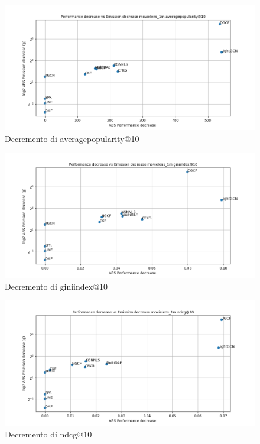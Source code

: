 \begin{figure}[H]
    \centering
     \includegraphics[width=\textwidth]{images/decrement_averagepopularity@10_movielens_1m_40_7.png}
    \caption{Decremento di averagepopularity@10}
\end{figure}

\begin{figure}[H]
    \centering
     \includegraphics[width=\textwidth]{images/decrement_giniindex@10_movielens_1m_40_7.png}
    \caption{Decremento di giniindex@10}
\end{figure}

\begin{figure}[H]
    \centering
     \includegraphics[width=\textwidth]{images/decrement_ndcg@10_movielens_1m_40_7.png}
    \caption{Decremento di ndcg@10}
\end{figure}

